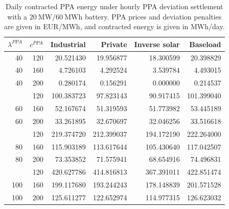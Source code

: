 \begin{table}[p]
\centering
\small
\caption{Daily contracted PPA energy under hourly PPA deviation settlement with a $20~\mathrm{MW}/60~\mathrm{MWh}$ battery. PPA prices and deviation penalties are given in EUR/MWh, and contracted energy is given in MWh/day.}
\label{tab:contracted-energy-hourly-p-20-e-60}
\begin{tabular*}{\textwidth}{@{\extracolsep{\fill}}rrrrrr@{}}
\toprule
$\lambda^{PPA}$ & $c^{PPA}$ & Industrial & Private & Inverse solar & Baseload \\
\midrule
40 & 120 & 20.521430 & 19.956877 & 18.300599 & 20.398829 \\
40 & 160 & 4.726103 & 4.292524 & 3.539784 & 4.493015 \\
40 & 200 & 0.280174 & 0.156291 & 0.000000 & 0.214537 \\
\addlinespace
60 & 120 & 100.383723 & 97.823143 & 90.917415 & 101.399040 \\
60 & 160 & 52.167674 & 51.319593 & 51.773982 & 53.445189 \\
60 & 200 & 33.261895 & 32.670697 & 32.046256 & 33.516618 \\
\addlinespace
80 & 120 & 219.374720 & 212.399037 & 194.172190 & 222.264000 \\
80 & 160 & 115.903189 & 113.617644 & 105.430640 & 117.042507 \\
80 & 200 & 73.353852 & 71.575941 & 68.654916 & 74.496831 \\
\addlinespace
100 & 120 & 420.627786 & 414.816813 & 367.391011 & 422.851474 \\
100 & 160 & 199.117680 & 193.244243 & 178.148839 & 201.571528 \\
100 & 200 & 125.611277 & 122.652974 & 114.977315 & 126.623032 \\
\bottomrule
\end{tabular*}
\end{table}



